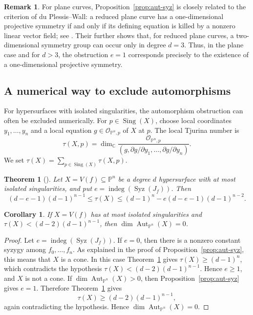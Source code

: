 \documentclass[11pt]{amsart}
\theoremstyle{plain}
\newtheorem{thm}[subsection]{Theorem}
\newtheorem{cor}[subsection]{Corollary}
\theoremstyle{definition}
\newtheorem{rk}[subsection]{Remark}
\numberwithin{equation}{section}
\newcommand{\C}{\mathbb{C}}
\newcommand{\PP}{\mathbb{P}}
\DeclareMathOperator{\Aut}{Aut}
\DeclareMathOperator{\Sing}{Sing}
\begin{document}
\begin{rk}
\label{rk:du-plessis-wall-symmetry}
For plane curves, Proposition~\ref{prop:aut-syz} is closely related to the criterion of du Plessis--Wall: a reduced plane curve has a one-dimensional
projective symmetry if and only if its defining equation is killed by a nonzero linear vector field; see \cite[Proposition~1.1]{duPCTC2}. Their
\cite[Proposition~1.2]{duPCTC2} further shows that, for reduced plane curves, a two-dimensional symmetry group can occur only in degree $d=3$. Thus, in the
plane case and for $d>3$, the obstruction $e=1$ corresponds precisely to the existence of a one-dimensional projective symmetry.
\end{rk}

\subsection{A numerical way to exclude automorphisms}

For hypersurfaces with isolated singularities, the automorphism obstruction can
often be excluded numerically. For $p\in\Sing(X)$, choose local coordinates
$y_1,\ldots,y_n$ and a local equation $g\in\mathcal O_{\PP^n,p}$ of $X$ at $p$.
The local Tjurina number is
\[
\tau(X,p)=\dim_\C
\frac{\mathcal O_{\PP^n,p}}{(g,\partial g/\partial y_1,\ldots,\partial g/\partial y_n)}.
\]
We set $\tau(X)=\sum_{p\in\Sing(X)}\tau(X,p)$.

\begin{thm}[{\cite[Theorem~5.3]{duPCTC01}}]
\label{thm:tjurina-bound}
Let $X=V(f)\subseteq \PP^n$ be a degree $d$ hypersurface with at most isolated
singularities, and put $e=\operatorname{indeg}(\operatorname{Syz}(J_f))$. Then
\[
(d-e-1)(d-1)^{n-1}\leq \tau(X)
\leq (d-1)^n-e(d-e-1)(d-1)^{n-2}.
\]
\end{thm}

\begin{cor}
\label{cor:no-aut-tau}
If $X=V(f)$ has at most isolated singularities and
$\tau(X)<(d-2)(d-1)^{n-1}$, then $\dim\Aut_{\PP^n}(X)=0$.
\end{cor}

\begin{proof}
Let $e=\operatorname{indeg}(\operatorname{Syz}(J_f))$. If $e=0$, then there is a
nonzero constant syzygy among $f_0,\ldots,f_n$. As explained in the proof of
Proposition~\ref{prop:aut-syz}, this means that $X$ is a cone. In this case
Theorem~\ref{thm:tjurina-bound} gives
$\tau(X)\geq (d-1)^n$,
which contradicts the hypothesis
$\tau(X)<(d-2)(d-1)^{n-1}$. Hence $e\geq1$, and $X$ is not a cone.
If $\dim\Aut_{\PP^n}(X)>0$, then Proposition~\ref{prop:aut-syz} gives $e=1$.
Therefore Theorem~\ref{thm:tjurina-bound} gives
\[
\tau(X)\geq (d-2)(d-1)^{n-1},
\]
again contradicting the hypothesis. Hence
$\dim\Aut_{\PP^n}(X)=0$.
\end{proof}
\end{document}
